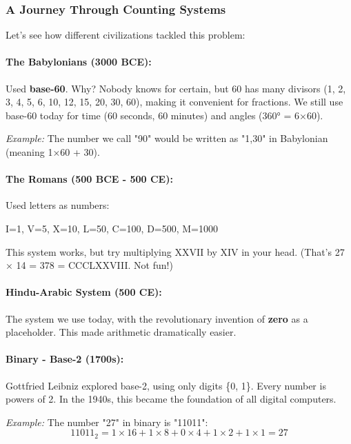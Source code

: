 \subsubsection*{A Journey Through Counting Systems}

Let's see how different civilizations tackled this problem:

\paragraph{The Babylonians (3000 BCE):} Used \textbf{base-60}. Why? Nobody knows for certain, but 60 has many divisors (1, 2, 3, 4, 5, 6, 10, 12, 15, 20, 30, 60), making it convenient for fractions. We still use base-60 today for time (60 seconds, 60 minutes) and angles (360° = 6×60).

\textit{Example:} The number we call "90" would be written as "1,30" in Babylonian (meaning 1×60 + 30).

\paragraph{The Romans (500 BCE - 500 CE):} Used letters as numbers:
\begin{center}
I=1, \quad V=5, \quad X=10, \quad L=50, \quad C=100, \quad D=500, \quad M=1000
\end{center}

This system works, but try multiplying XXVII by XIV in your head. (That's 27 × 14 = 378 = CCCLXXVIII. Not fun!)

\paragraph{Hindu-Arabic System (500 CE):} The system we use today, with the revolutionary invention of \textbf{zero} as a placeholder. This made arithmetic dramatically easier.

\paragraph{Binary - Base-2 (1700s):} Gottfried Leibniz explored base-2, using only digits \{0, 1\}. Every number is powers of 2. In the 1940s, this became the foundation of all digital computers.

\textit{Example:} The number "27" in binary is "11011":
\begin{equation}
11011_2 = 1×16 + 1×8 + 0×4 + 1×2 + 1×1 = 27
\end{equation}

